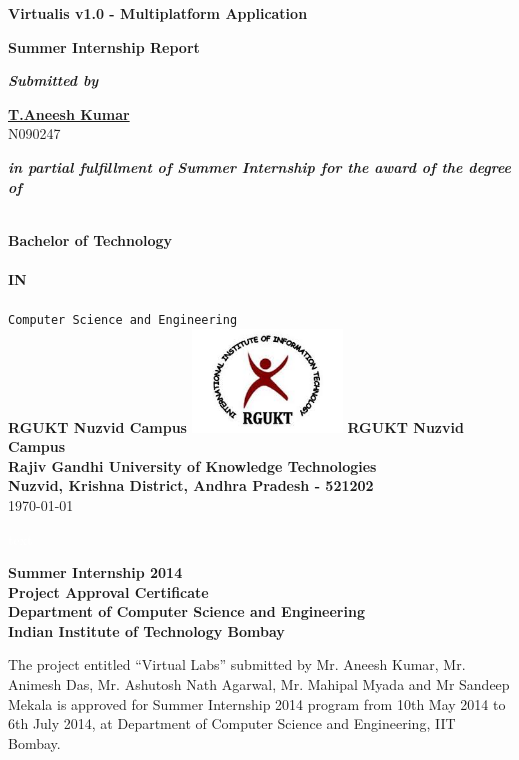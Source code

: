 \documentclass[12pt]{report}
\begin{document}
\begin{titlepage}
 \begin{center}
 
\fontsize{20pt}{10pt}
\textbf{Virtualis v1.0 - Multiplatform Application} 

\fontsize{14pt}{10pt}
\vfill
\textbf{Summer Internship Report }
\vfill

\fontsize{12pt}{10pt}
\textit{\textbf{Submitted by}}

\vfill
\fontsize{16pt}{10pt}
\underline{\textbf{T.Aneesh Kumar}} \\ 
\fontsize{14pt}{10pt}
N090247 

\renewcommand{\baselinestretch}{1.50}\normalsize
\vfill
\fontsize{12pt}{10pt}
\textit{\textbf{in partial fulfillment of Summer Internship for the award of the degree of}}  

\vfill
\fontsize{16pt}{10pt}
\textbf{\\ Bachelor of Technology \\} 
\fontsize{14pt}{10pt}
\textbf{\\ IN \\} 
\fontsize{14pt}{10pt}
\texttt{\\ Computer Science and Engineering \\ }
\textbf{RGUKT Nuzvid Campus } 
\vfill
\includegraphics[width=4cm]{rgukt_logo.jpg} 
\vfill
\textbf{RGUKT Nuzvid Campus } \\
\textbf{Rajiv Gandhi University of Knowledge Technologies} \\
\textbf{Nuzvid, Krishna District, Andhra Pradesh - 521202} \\

\vfill
\today
\end{center}
\end{titlepage}

 \pagebreak \textcolor{white}{text} \pagebreak
\thispagestyle{empty}

\begin{center}
\thispagestyle{empty}
\LARGE
\textbf{Summer Internship 2014 \\ Project Approval Certificate} \\
\vskip12pt
\Large
\textbf{Department of Computer Science and Engineering} \\
\vskip5pt
\textbf{Indian Institute of Technology Bombay} \\
\end{center}
\vfill
\normalsize
The project entitled ``Virtual Labs'' submitted by Mr. Aneesh Kumar, Mr. Animesh Das, Mr. Ashutosh Nath Agarwal, Mr. Mahipal Myada and Mr Sandeep Mekala is approved for Summer Internship 2014 program from 10th May 2014 to 6th July 2014, at Department of Computer Science and Engineering, IIT Bombay.
\end{document}
